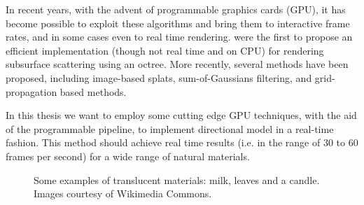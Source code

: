 In recent years, with the advent of programmable graphics cards (GPU), it has become possible to exploit these algorithms and bring them to interactive frame rates, and in some cases even to real time rendering. \cite{Jensen:2002:RHR:566654.566619} were the first to propose an efficient implementation (though not real time and on CPU) for rendering subsurface scattering using an octree. More recently, several methods have been proposed, including image-based splats, sum-of-Gaussians filtering, and grid-propagation based methods.

In this thesis we want to employ some cutting edge GPU techniques, with the aid of the programmable pipeline, to implement \citeauthor{IMM2013-06646} directional model in a real-time fashion. This method should achieve real time results (i.e. in the range of 30 to 60 frames per second) for a wide range of natural materials.

\begin{figure}
\centering
{}
\caption{Some examples of translucent materials: milk, leaves and a candle. Images courtesy of Wikimedia Commons.}
\label{fig:ex1}
\end{figure}
